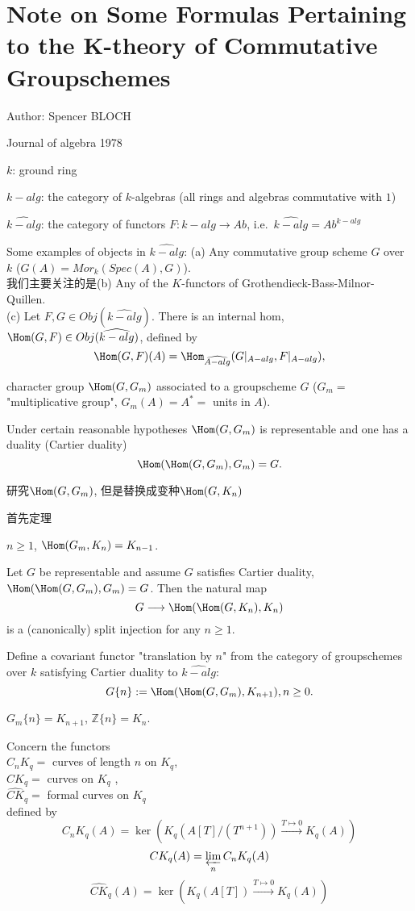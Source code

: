 \chapter{Note on Some Formulas Pertaining to the K-theory of Commutative Groupschemes}

Author: Spencer BLOCH

Journal of algebra 1978

$k$: ground ring

$k-alg$: the category of $k$-algebras (all rings and algebras commutative with $1$)

$\widehat{k-alg}$: the category  of functors $F: k-alg \longrightarrow Ab$, i.e.\ $\widehat{k-alg}=Ab^{k-alg}$

Some examples of objects in $\widehat{k-alg}$:
(a)  Any commutative  group  scheme $G$ over $k$ ($G(A)=Mor_k(Spec(A),G)$).\\
我们主要关注的是(b)  Any  of the $K$-functors of Grothendieck-Bass-Milnor-Quillen.\\
(c)  Let  $F,  G \in Obj(\widehat{k-alg})$. There is an internal  hom, $\Hom(G, F) \in  Obj(\widehat{k-alg})$,
defined  by
\[\Hom(G, F)(A)  =  \Hom_{\widehat{A-alg}}(G|_{A-alg}, F|_{A-alg}),\]

character  group  $\Hom(G, G_m)$  associated  to a groupscheme  $G$ ($G_m=$
"multiplicative  group",  $G_m(A)  =  A^*  = $ units in $A$). 

Under  certain  reasonable hypotheses  $\Hom(G,  G_m)$  is representable  and one has a duality  (Cartier  duality)
\[\Hom(\Hom(G, G_m), G_m) = G.\]

研究$\Hom(G, G_m)$, 但是替换成变种$\Hom(G, K_n)$

首先定理
\begin{theorem}
	$n\geq 1$, $\Hom(G_m,K_n)=K_{n-1}$.
\end{theorem}
\begin{theorem}
	Let $G$ be representable  and assume $G$ satisfies Cartier  duality,
$\Hom(\Hom(G, G_m), G_m) = G$. Then the natural  map
\[G \longrightarrow  \Hom(\Hom(G, K_n), K_n) \]
is a (canonically)  split injection  for any $n \geq  1$.
\end{theorem}

\begin{definition}
	Define  a covariant  functor  "translation  by $n$" from  the category  of groupschemes  over  $k$ satisfying  Cartier  duality  to $\widehat{k-alg}$:
	\[G\{n\} := \Hom(\Hom(G, G_m), K_{n+1}), n\geq 0.\]
\end{definition}
\begin{example}
	$G_m\{n\}=K_{n+1}$, $\mathbb{Z}\{n\}=K_n$.
\end{example}
Concern the functors\\
$C_nK_q =$ curves of length $n$ on $K_q$,\\
$CK_q=$   curves  on $K_q$ ,\\
$\widehat{CK}_q=$ formal  curves on $K_q$\\
defined  by
\[C_nK_q(A)  = \ker(K_q(A[T]/(T^{n+1})) \overset{T\mapsto 0}\longrightarrow K_q(A))\]
\[CK_q(A)=\varprojlim_n C_nK_q(A)\] %
\[\widehat{CK}_q(A)=\ker(K_q(A[T]) \overset{T\mapsto 0}\longrightarrow K_q(A))\]

